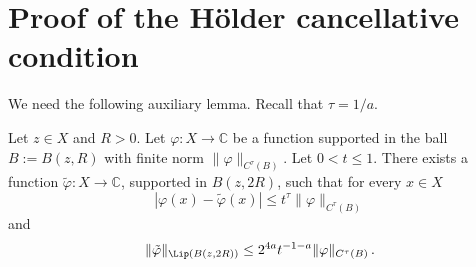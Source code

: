 \chapter{Proof of the H\"older cancellative condition}
\label{liphoel}

We need the following auxiliary lemma.
Recall that $\tau = 1/a$.

\begin{lemma}
    \label{Lipschitz-Holder-approximation}
    \leanok
    Let $z\in X$ and $R>0$. Let $\varphi: X \to \mathbb{C}$ be a function supported in the ball
    $B:=B(z,R)$ with finite norm $\|\varphi\|_{C^\tau(B)}$. Let $0<t \leq 1$. There exists a function $\tilde \varphi : X \to \mathbb{C}$, supported in $B(z,2R)$, such that for every $x\in X$
    \begin{equation}\label{eq-firstt}
        |\varphi(x) - \tilde \varphi(x)| \leq t^{\tau} \|\varphi\|_{C^\tau(B)}
    \end{equation}and
   \begin{equation}\label{eq-secondt}
       \|\tilde \varphi\|_{\Lip(B(z,2R))} \leq 2^{4a}t^{-1-a} \|\varphi\|_{C^{\tau}(B)}\, .
   \end{equation}
\end{lemma}


